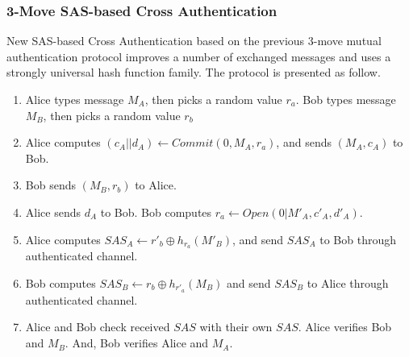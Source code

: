 \subsubsection*{3-Move SAS-based Cross Authentication}

New SAS-based Cross Authentication based on the previous 3-move mutual authentication protocol improves a number of exchanged messages and uses a strongly universal hash function family. The protocol is presented as follow. 
 
\begin{enumerate}
\item Alice types message $M_A$, then picks a random value $r_a$. Bob types message $M_B$, then picks a random value $r_b$
\item Alice computes $(c_A||d_A) \leftarrow Commit(0,M_A,r_a)$, and sends $(M_A,c_A)$ to Bob.
\item Bob sends $(M_B,r_b)$ to Alice.
\item Alice sends $d_A$ to Bob. Bob computes $r_a \leftarrow Open(0|M'_A,c'_A,d'_A)$. 
\item Alice computes $SAS_A \leftarrow r'_b \oplus h_{r_a}(M'_B)$, and send $SAS_A$ to Bob through authenticated channel. 
\item Bob computes $SAS_B \leftarrow r_b \oplus h_{r'_a}(M_B)$ and send $SAS_B$ to Alice through authenticated channel. 
\item Alice and Bob check received $SAS$ with their own $SAS$. Alice verifies Bob and $M_B$. And, Bob verifies Alice and $M_A$.
\end{enumerate}

